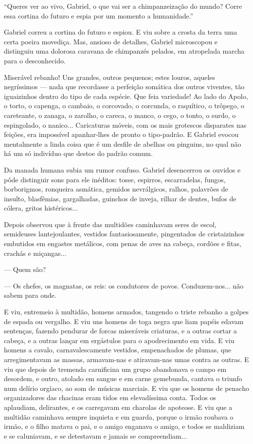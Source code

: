 ``Queres ver ao vivo, Gabriel, o que vai ser a chimpanzeização do mundo?
Corre essa cortina do futuro e espia por um momento a humanidade.''

Gabriel correu a cortina do futuro e espiou. E viu sobre a crosta da
terra uma certa poeira movediça. Mas, ansioso de detalhes, Gabriel
microscopou e distinguiu uma dolorosa caravana de chimpanzés pelados, em
atropelada marcha para o desconhecido.

Miserável rebanho! Uns grandes, outros pequenos; estes louros, aqueles
negríssimos --- nada que recordasse a perfeição somática dos outros
viventes, tão iguaizinhos dentro do tipo de cada espécie. Que feia
variedade! Ao lado do Apolo, o torto, o capenga, o cambaio, o corcovado,
o corcunda, o raquítico, o trôpego, o careteante, o zanaga, o zarolho, o
careca, o manco, o cego, o tonto, o surdo, o espingolado, o nanico...
Caricaturas móveis, com os mais grotescos disparates nas feições, era
impossível apanhar-lhes de pronto o tipo-padrão. E Gabriel evocou
mentalmente a linda coisa que é um desfile de abelhas ou pinguins, no
qual não há um só indivíduo que destoe do padrão comum.

Da manada humana subia um rumor confuso. Gabriel desencerrou os ouvidos
e pôde distinguir sons para ele inéditos: tosse, espirros, escarradelas,
fungos, borborigmos, ronqueira asmática, gemidos nevrálgicos, ralhos,
palavrões de insulto, blasfêmias, gargalhadas, guinchos de inveja,
rilhar de dentes, bufos de cólera, gritos histéricos...

Depois observou que à frente das multidões caminhavam seres de escol,
semideuses lantejoulantes, vestidos fantasiosamente, pingentados de
cristaizinhos embutidos em engastes metálicos, com penas de aves na
cabeça, cordões e fitas, crachás e miçangas...

--- Quem são?

--- Os chefes, os magnatas, os reis: os condutores de povos.
Conduzem-nos... não sabem para onde.

E viu, entremeio à multidão, homens armados, tangendo o triste rebanho a
golpes de espada ou vergalho. E viu uns homens de toga negra que liam
papéis edavam sentenças, fazendo pendurar de forcas miseráveis
criaturas, e a outras cortar a cabeça, e a outras lançar em ergástulos
para o apodrecimento em vida. E viu homens a cavalo, carnavalescamente
vestidos, empenachados de plumas, que arregimentavam as massas,
armavam-nas e atiravam-nas umas contra as outras. E viu que depois de
tremenda carnificina um grupo abandonava o campo em desordem, e outro,
atolado em sangue e em carne gemebunda, cantava o triunfo num delírio
orgíaco, ao som de músicas marciais. E viu que os homens de penacho
organizadores das chacinas eram tidos em elevadíssima conta. Todos os
aplaudiam, delirantes, e os carregavam em charolas de apoteose. E viu
que a multidão caminhava sempre inquieta e em guarda, porque o irmão
roubava o irmão, e o filho matava o pai, e o amigo enganava o amigo, e
todos se maldiziam e se caluniavam, e se detestavam e jamais se
compreendiam...

